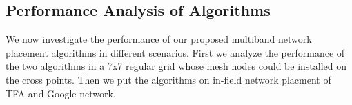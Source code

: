\subsection{Performance Analysis of Algorithms}
\label{subsec:results}

We now investigate the performance of our proposed
multiband network placement algorithms in different scenarios.
First we analyze the performance of the two algorithms in a 7x7 regular grid whose mesh nodes could be installed on the cross points.
Then we put the algorithms on in-field network placment of TFA and Google network.



